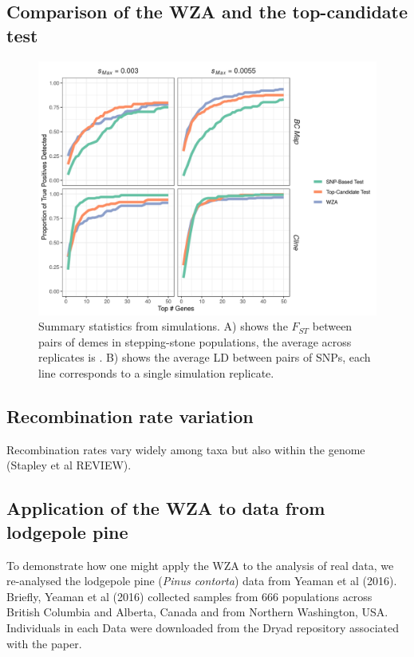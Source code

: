 \documentclass[11pt,twoside,lineno]{GSA_format}
\begin{document}
\subsection{Comparison of the WZA and the top-candidate test}



\begin{figure}
  \includegraphics[]{../SimulationStudy/directionalSelection/G.2.3/PowerPlot_sampledData.png}
  \caption{Summary statistics from simulations. A) shows the $F_{ST}$ between pairs of demes in stepping-stone populations, the average across replicates is . B) shows the average LD between pairs of SNPs, each line corresponds to a single simulation replicate.}

  \label{fig:lodgepole}
\end{figure}


\subsection{Recombination rate variation}

Recombination rates vary widely among taxa but also within the genome (Stapley et al REVIEW). 

\subsection{Application of the WZA to data from lodgepole pine}

To demonstrate how one might apply the WZA to the analysis of real data, we re-analysed the lodgepole pine (\textit{Pinus contorta}) data from Yeaman et al (2016). Briefly, Yeaman et al (2016) collected samples from 666 populations across British Columbia and Alberta, Canada and from Northern Washington, USA. Individuals in each 
Data were downloaded from the Dryad repository associated with the paper. 
\end{document}
